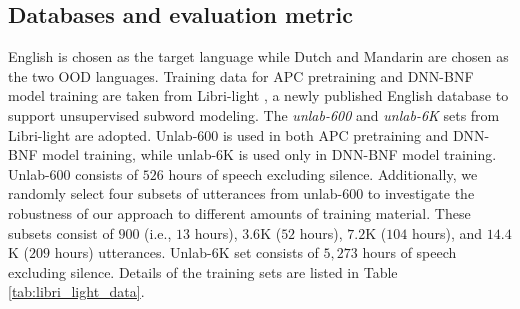 \documentclass[a4paper]{article}
\begin{document}
\subsection{Databases and evaluation metric}
 English is chosen as the target language while Dutch and Mandarin are chosen as the two OOD languages. %
Training data for APC pretraining and DNN-BNF model training are taken from  Libri-light \cite{kahn2019librilight}, 
a newly published English database
to support unsupervised subword modeling. 
The \textit{unlab-600} and  \textit{unlab-6K} sets from Libri-light are adopted. Unlab-600 is used in both APC pretraining and DNN-BNF model training, while unlab-6K is used only in DNN-BNF model training.
Unlab-600   consists of 
$526$ hours of speech excluding silence.
Additionally, we randomly select four subsets of utterances from unlab-600 to investigate the robustness of our approach to different amounts of training material. These subsets consist of $900$ (i.e., $13$ hours), $3.6$K ($52$ hours), $7.2$K ($104$ hours), and $14.4$K ($209$ hours)   utterances. 
Unlab-6K  set consists of $5,273$ hours of
speech excluding silence.  Details of the training sets are listed in Table \ref{tab:libri_light_data}.
\begin{table}[!t]
\renewcommand\arraystretch{0.9}
\centering
\caption{Libri-light training data and its subsets.}
\label{tab:libri_light_data}
\end{table}
\end{document}
